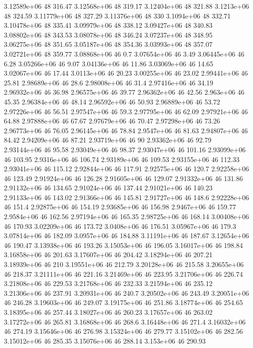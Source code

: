 3.12589e+06 48 316.47
3.12568e+06 48 319.17
3.12404e+06 48 321.88
3.1213e+06 48 324.59
3.11779e+06 48 327.29
3.11376e+06 48 330
3.1094e+06 48 332.71
3.10478e+06 48 335.41
3.09979e+06 48 338.12
3.09427e+06 48 340.83
3.08802e+06 48 343.53
3.08078e+06 48 346.24
3.07237e+06 48 348.95
3.06275e+06 48 351.65
3.05187e+06 48 354.36
3.03993e+06 48 357.07
3.02721e+06 48 359.77
3.08868e+06 46 0.7
3.07654e+06 46 3.49
3.06445e+06 46 6.28
3.05266e+06 46 9.07
3.04136e+06 46 11.86
3.03069e+06 46 14.65
3.02067e+06 46 17.44
3.0113e+06 46 20.23
3.00255e+06 46 23.02
2.99441e+06 46 25.81
2.98689e+06 46 28.6
2.98008e+06 46 31.4
2.97416e+06 46 34.19
2.96932e+06 46 36.98
2.96575e+06 46 39.77
2.96362e+06 46 42.56
2.963e+06 46 45.35
2.96384e+06 46 48.14
2.96592e+06 46 50.93
2.96889e+06 46 53.72
2.97226e+06 46 56.51
2.97547e+06 46 59.3
2.97795e+06 46 62.09
2.97921e+06 46 64.88
2.97888e+06 46 67.67
2.97679e+06 46 70.47
2.97298e+06 46 73.26
2.96773e+06 46 76.05
2.96145e+06 46 78.84
2.9547e+06 46 81.63
2.94807e+06 46 84.42
2.94209e+06 46 87.21
2.93719e+06 46 90
2.93362e+06 46 92.79
2.93144e+06 46 95.58
2.93049e+06 46 98.37
2.93047e+06 46 101.16
2.93099e+06 46 103.95
2.9316e+06 46 106.74
2.93189e+06 46 109.53
2.93155e+06 46 112.33
2.93041e+06 46 115.12
2.92844e+06 46 117.91
2.92575e+06 46 120.7
2.92258e+06 46 123.49
2.91924e+06 46 126.28
2.91605e+06 46 129.07
2.91332e+06 46 131.86
2.91132e+06 46 134.65
2.91024e+06 46 137.44
2.91021e+06 46 140.23
2.91133e+06 46 143.02
2.91366e+06 46 145.81
2.91727e+06 46 148.6
2.92228e+06 46 151.4
2.92875e+06 46 154.19
2.93685e+06 46 156.98
2.9467e+06 46 159.77
2.9584e+06 46 162.56
2.97194e+06 46 165.35
2.98725e+06 46 168.14
3.00408e+06 46 170.93
3.02209e+06 46 173.72
3.0408e+06 46 176.51
3.05967e+06 46 179.3
3.07814e+06 46 182.09
3.0957e+06 46 184.88
3.11191e+06 46 187.67
3.12654e+06 46 190.47
3.13938e+06 46 193.26
3.15053e+06 46 196.05
3.16017e+06 46 198.84
3.16858e+06 46 201.63
3.17607e+06 46 204.42
3.18294e+06 46 207.21
3.18939e+06 46 210
3.19551e+06 46 212.79
3.20128e+06 46 215.58
3.20655e+06 46 218.37
3.21111e+06 46 221.16
3.21469e+06 46 223.95
3.21706e+06 46 226.74
3.21808e+06 46 229.53
3.21768e+06 46 232.33
3.21594e+06 46 235.12
3.21306e+06 46 237.91
3.20931e+06 46 240.7
3.20502e+06 46 243.49
3.20051e+06 46 246.28
3.19603e+06 46 249.07
3.19175e+06 46 251.86
3.18774e+06 46 254.65
3.18395e+06 46 257.44
3.18027e+06 46 260.23
3.17657e+06 46 263.02
3.17272e+06 46 265.81
3.16868e+06 46 268.6
3.16448e+06 46 271.4
3.16032e+06 46 274.19
3.15646e+06 46 276.98
3.15324e+06 46 279.77
3.15102e+06 46 282.56
3.15012e+06 46 285.35
3.15076e+06 46 288.14
3.153e+06 46 290.93
